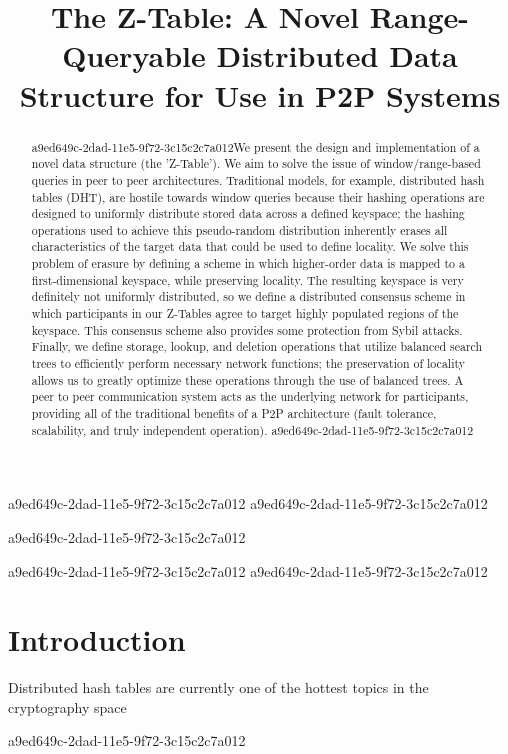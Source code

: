 \documentclass[12pt]{article}
\title{The Z-Table: A Novel Range-Queryable Distributed Data Structure for Use in P2P Systems}
\begin{document}
a9ed649c-2dad-11e5-9f72-3c15c2c7a012
a9ed649c-2dad-11e5-9f72-3c15c2c7a012\maketitle
a9ed649c-2dad-11e5-9f72-3c15c2c7a012
\begin{abstract}
a9ed649c-2dad-11e5-9f72-3c15c2c7a012We present the design and implementation of a novel data structure (the 'Z-Table'). We aim to solve the issue of window/range-based queries in peer to peer architectures. Traditional models, for example,  distributed hash tables (DHT), are hostile towards window queries because their hashing operations are designed to uniformly distribute stored data across a defined keyspace; the hashing operations used to achieve this pseudo-random distribution inherently erases all characteristics of the target data that could be used to define locality. We solve this problem of erasure by defining a scheme in which higher-order data is mapped to a first-dimensional keyspace, while preserving locality. The resulting keyspace is very definitely not uniformly distributed, so we define a distributed consensus scheme in which participants in our Z-Tables agree to target highly populated regions of the keyspace. This consensus scheme also provides some protection from Sybil attacks. Finally, we define storage, lookup, and deletion operations that utilize balanced search trees to efficiently perform necessary network functions; the preservation of locality allows us to greatly optimize these operations through the use of balanced trees. A peer to peer communication system acts as the underlying network for participants, providing all of the traditional benefits of a P2P architecture (fault tolerance, scalability, and truly independent operation).
a9ed649c-2dad-11e5-9f72-3c15c2c7a012\end{abstract}

a9ed649c-2dad-11e5-9f72-3c15c2c7a012
\newpage
a9ed649c-2dad-11e5-9f72-3c15c2c7a012\section{Introduction}
Distributed hash tables are currently one of the hottest topics in the cryptography space~\cite{Stoica:2001dj,Rowstron:2001ea,Ratnasamy:2001wn}

a9ed649c-2dad-11e5-9f72-3c15c2c7a012\printbibliography
\end{document}

